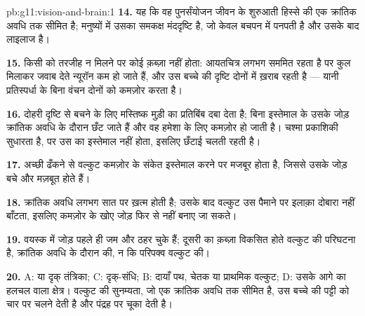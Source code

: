 \begin{solution}{pb:g11:vision-and-brain:1}
\textbf{14.} यह कि वह पुनर्संयोजन जीवन के शुरुआती हिस्से की एक क्रांतिक अवधि
तक सीमित है; मनुष्यों में उसका समकक्ष मंददृष्टि है, जो केवल बचपन में पनपती
है और उसके बाद लाइलाज है।

\textbf{15.} किसी  को तरजीह न मिलने पर कोई क़ब्ज़ा नहीं होता: आयतचित्र
लगभग सममित रहता है पर कुल मिलाकर जवाब देते न्यूरॉन कम हो जाते हैं, और उस
बच्चे की दृष्टि दोनों  में ख़राब रहती है --- यानी प्रतिस्पर्धा के बिना
वंचन दोनों को कमज़ोर करता है।

\textbf{16.} दोहरी दृष्टि से बचने के लिए मस्तिष्क मुड़ी  का प्रतिबिंब दबा
देता है; बिना इस्तेमाल के उसके जोड़ क्रांतिक अवधि के दौरान छँट जाते हैं और
वह  हमेशा के लिए कमज़ोर हो जाती है। चश्मा प्रकाशिकी सुधारता है, पर उस
 का इस्तेमाल नहीं होता, इसलिए छँटाई चलती रहती है।

\textbf{17.} अच्छी  ढँकने से वल्कुट कमज़ोर  के संकेत इस्तेमाल करने पर
मजबूर होता है, जिससे उसके जोड़ बचे और मज़बूत होते हैं।

\textbf{18.} क्रांतिक अवधि लगभग सात पर ख़त्म होती है; उसके बाद वल्कुट उस
पैमाने पर इलाक़ा दोबारा नहीं बाँटता, इसलिए कमज़ोर  के खोए जोड़ फिर से
नहीं बनाए जा सकते।

\textbf{19.} वयस्क में जोड़ पहले ही जम और ठहर चुके हैं; दूसरी  का क़ब्ज़ा
विकसित होते वल्कुट की परिघटना है, क्रांतिक अवधि के दौरान की, न कि परिपक्व
वल्कुट की।

\textbf{20.} A:  या दृक् तंत्रिका; C: दृक्-संधि; B: दायाँ पथ, चेतक या प्राथमिक
वल्कुट; D: उसके आगे का हलचल वाला क्षेत्र। वल्कुट की सुनम्यता, जो एक क्रांतिक
अवधि तक सीमित है, उस बच्चे की पट्टी को चार पर चलने देती है और पंद्रह पर चूका
देती है।
\end{solution}
